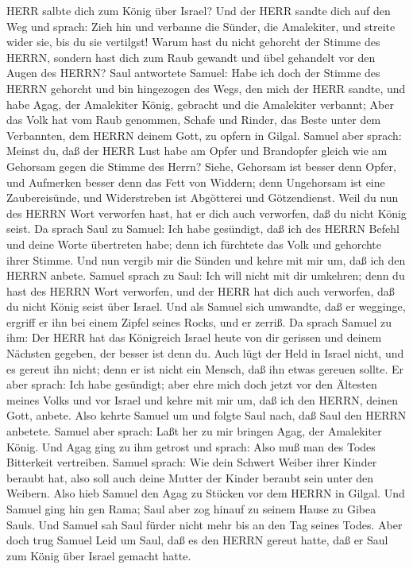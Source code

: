 HERR salbte dich zum König über Israel?  Und der HERR
sandte dich auf den Weg und sprach: Zieh hin und verbanne die Sünder,
die Amalekiter, und streite wider sie, bis du sie vertilgst!
 Warum hast du nicht gehorcht der Stimme des HERRN, sondern
hast dich zum Raub gewandt und übel gehandelt vor den Augen des HERRN?
 Saul antwortete Samuel: Habe ich doch der Stimme des HERRN
gehorcht und bin hingezogen des Wegs, den mich der HERR sandte, und habe
Agag, der Amalekiter König, gebracht und die Amalekiter verbannt;
 Aber das Volk hat vom Raub genommen, Schafe und Rinder,
das Beste unter dem Verbannten, dem HERRN deinem Gott, zu opfern in
Gilgal.  Samuel aber sprach: Meinst du, daß der HERR Lust
habe am Opfer und Brandopfer gleich wie am Gehorsam gegen die Stimme des
Herrn? Siehe, Gehorsam ist besser denn Opfer, und Aufmerken besser denn
das Fett von Widdern;  denn Ungehorsam ist eine
Zaubereisünde, und Widerstreben ist Abgötterei und Götzendienst. Weil du
nun des HERRN Wort verworfen hast, hat er dich auch verworfen, daß du
nicht König seist.  Da sprach Saul zu Samuel: Ich habe
gesündigt, daß ich des HERRN Befehl und deine Worte übertreten habe;
denn ich fürchtete das Volk und gehorchte ihrer Stimme. 
Und nun vergib mir die Sünden und kehre mit mir um, daß ich den HERRN
anbete.  Samuel sprach zu Saul: Ich will nicht mit dir
umkehren; denn du hast des HERRN Wort verworfen, und der HERR hat dich
auch verworfen, daß du nicht König seist über Israel.  Und
als Samuel sich umwandte, daß er wegginge, ergriff er ihn bei einem
Zipfel seines Rocks, und er zerriß.  Da sprach Samuel zu
ihm: Der HERR hat das Königreich Israel heute von dir gerissen und
deinem Nächsten gegeben, der besser ist denn du.  Auch lügt
der Held in Israel nicht, und es gereut ihn nicht; denn er ist nicht ein
Mensch, daß ihn etwas gereuen sollte.  Er aber sprach: Ich
habe gesündigt; aber ehre mich doch jetzt vor den Ältesten meines Volks
und vor Israel und kehre mit mir um, daß ich den HERRN, deinen Gott,
anbete.  Also kehrte Samuel um und folgte Saul nach, daß
Saul den HERRN anbetete.  Samuel aber sprach: Laßt her zu
mir bringen Agag, der Amalekiter König. Und Agag ging zu ihm getrost und
sprach: Also muß man des Todes Bitterkeit vertreiben. 
Samuel sprach: Wie dein Schwert Weiber ihrer Kinder beraubt hat, also
soll auch deine Mutter der Kinder beraubt sein unter den Weibern. Also
hieb Samuel den Agag zu Stücken vor dem HERRN in Gilgal. 
Und Samuel ging hin gen Rama; Saul aber zog hinauf zu seinem Hause zu
Gibea Sauls.  Und Samuel sah Saul fürder nicht mehr bis an
den Tag seines Todes. Aber doch trug Samuel Leid um Saul, daß es den
HERRN gereut hatte, daß er Saul zum König über Israel gemacht hatte.

